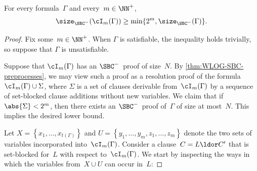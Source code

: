 \documentclass[12pt]{article}
\begin{document}
\begin{lemma}\label{thm:guarding-blocked-pair-hard-for-SBC}
  For every formula~$\Gamma$ and every~$m \in \NN^+$,
  \begin{equation*}
    \size_{\SBC^-}(\cI_m(\Gamma)) \geq \min\{2^m, \size_{\SBC^-}(\Gamma)\}.
  \end{equation*}
\end{lemma}
\begin{proof}
  Fix some~$m \in \NN^+$.
  When $\Gamma$ is satisfiable, the inequality holds trivially,
  so suppose that $\Gamma$ is unsatisfiable.

  Suppose that $\cI_m(\Gamma)$ has an $\SBC^-$~proof of size~$N$.
  By \cref{thm:WLOG-SBC-preprocesses}, we may view such a proof
  as a resolution proof of the formula~$\cI_m(\Gamma) \cup \Sigma$,
  where $\Sigma$ is a set of clauses derivable from~$\cI_m(\Gamma)$
  by a sequence of set-blocked clause additions without new variables.
  We claim that if $\abs{\Sigma} < 2^m$,
  then there exists an $\SBC^-$~proof of~$\Gamma$ of size at most~$N$.
  This implies the desired lower bound.

  Let $X = \left\{x_1, \dots, x_{t(\Gamma)}\right\}$
  and $U = \left\{y_1, \dots, y_m, z_1, \dots, z_m\right\}$
  denote the two sets of variables incorporated into~$\cI_m(\Gamma)$.
  Consider a clause~$C = L \ldor C'$ that is set-blocked
  for~$L$ with respect to~$\cI_m(\Gamma)$.
  We start by inspecting the ways in which
  the variables from~$X \cup U$ can occur in~$L$:


\end{proof}
\end{document}
